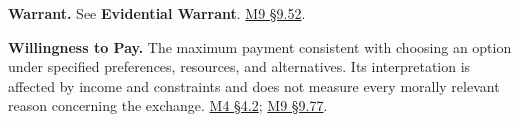 \noindent\textbf{Warrant.} See \textbf{Evidential Warrant}.
\hyperref[M09-truth-warrant-and-the-different-force-of-norms]{M9
§9.52}.

\noindent\textbf{Willingness to Pay.} The maximum payment consistent with
choosing an option under specified preferences, resources, and
alternatives. Its interpretation is affected by income and constraints
and does not measure every morally relevant reason concerning the
exchange.
\href{Marketing_Analytics_Lecture_Notes.pdf\#M04-utility-choice-probabilities-and-willingness-to-pay}{M4
§4.2};
\hyperref[M09-willingness-to-pay-and-equal-moral-standing]{M9
§9.77}.

\endgroup


